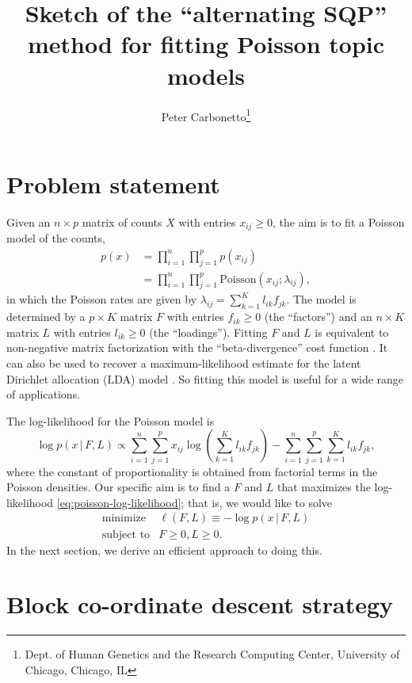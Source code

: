 \documentclass[final]{siamart171218}
\title{Sketch of the ``alternating SQP'' method for fitting Poisson
  topic models}
\author{Peter Carbonetto\thanks{Dept. of Human Genetics and the Research Computing Center, University of Chicago, Chicago, IL}}
\begin{document}
\maketitle

\section{Problem statement}

Given an $n \times p$ matrix of counts $X$ with entries $x_{ij} \geq
0$, the aim is to fit a Poisson model of the counts,
\begin{align}
p(x) &= \prod_{i=1}^n \prod_{j=1}^p p(x_{ij}) \nonumber \\
     &= \prod_{i=1}^n \prod_{j=1}^p \mathrm{Poisson}(x_{ij}; \lambda_{ij}),
\label{eq:poisson-likelihood}
\end{align}
in which the Poisson rates are given by $\lambda_{ij} = \sum_{k=1}^K
l_{ik} f_{jk}$. The model is determined by a $p \times K$ matrix $F$
with entries $f_{ik} \geq 0$ (the ``factors'') and an $n \times K$
matrix $L$ with entries $l_{ik} \geq 0$ (the ``loadings''). Fitting
$F$ and $L$ is equivalent to non-negative matrix factorization with
the ``beta-divergence'' cost function \cite{lee-2001}. It can also be
used to recover a maximum-likelihood estimate for the latent Dirichlet
allocation (LDA) model \cite{blei-2003}. So fitting this model is
useful for a wide range of applications.

The log-likelihood for the Poisson model is
\begin{equation}
\log p(x \,|\, F, L) \propto
  \sum_{i=1}^n \sum_{j=1}^p x_{ij} \log
  ({\textstyle \sum_{k=1}^K l_{ik} f_{jk}})
    - \sum_{i=1}^n \sum_{j=1}^p \sum_{k=1}^K l_{ik} f_{jk},
\label{eq:poisson-log-likelihood}
\end{equation}
where the constant of proportionality is obtained from factorial terms
in the Poisson densities. Our specific aim is to find a $F$ and $L$
that maximizes the log-likelihood \eqref{eq:poisson-log-likelihood};
that is, we would like to solve
\begin{equation}
\begin{array}{ll}
\mbox{minimize} & \ell(F,L) \equiv -\log p(x \,|\, F, L) \\
\mbox{subject to} & F \geq 0, L \geq 0.
\end{array}
\label{eq:problem}
\end{equation}
In the next section, we derive an efficient approach to doing this.

\section{Block co-ordinate descent strategy}
\end{document}
